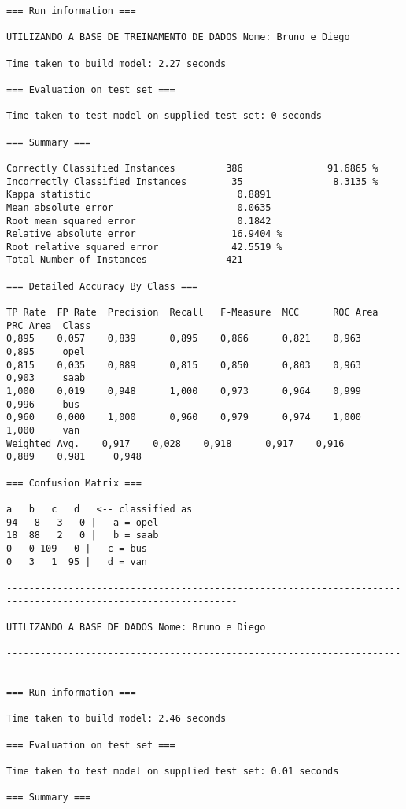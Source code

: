 \documentclass[
	article,			%
	11pt,				%
	oneside,			%
	a4paper,			%
	english,			%
	brazil,				%
	sumario=tradicional
	]{abntex2}
\begin{document}
\begin{lstlisting}
=== Run information ===

UTILIZANDO A BASE DE TREINAMENTO DE DADOS Nome: Bruno e Diego

Time taken to build model: 2.27 seconds

=== Evaluation on test set ===

Time taken to test model on supplied test set: 0 seconds

=== Summary ===

Correctly Classified Instances         386               91.6865 %
Incorrectly Classified Instances        35                8.3135 %
Kappa statistic                          0.8891
Mean absolute error                      0.0635
Root mean squared error                  0.1842
Relative absolute error                 16.9404 %
Root relative squared error             42.5519 %
Total Number of Instances              421     

=== Detailed Accuracy By Class ===

TP Rate  FP Rate  Precision  Recall   F-Measure  MCC      ROC Area  PRC Area  Class
0,895    0,057    0,839      0,895    0,866      0,821    0,963     0,895     opel
0,815    0,035    0,889      0,815    0,850      0,803    0,963     0,903     saab
1,000    0,019    0,948      1,000    0,973      0,964    0,999     0,996     bus
0,960    0,000    1,000      0,960    0,979      0,974    1,000     1,000     van
Weighted Avg.    0,917    0,028    0,918      0,917    0,916      0,889    0,981     0,948     

=== Confusion Matrix ===

a   b   c   d   <-- classified as
94   8   3   0 |   a = opel
18  88   2   0 |   b = saab
0   0 109   0 |   c = bus
0   3   1  95 |   d = van

---------------------------------------------------------------------------------------------------------------

UTILIZANDO A BASE DE DADOS Nome: Bruno e Diego

---------------------------------------------------------------------------------------------------------------

=== Run information ===

Time taken to build model: 2.46 seconds

=== Evaluation on test set ===

Time taken to test model on supplied test set: 0.01 seconds

=== Summary ===


\end{lstlisting}
\end{document}
